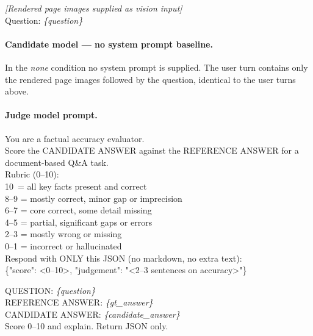 \documentclass{article} %
\begin{document}
\begin{promptbox}
\ttfamily\small
\textit{[Rendered page images supplied as vision input]}\\[3pt]
Question: \textit{\{question\}}
\end{promptbox}

\paragraph{Candidate model — no system prompt baseline.}
In the \textit{none} condition no system prompt is supplied.
The user turn contains only the rendered page images followed by the question,
identical to the user turns above.

\paragraph{Judge model prompt.}

\begin{promptbox}
\ttfamily\small
You are a factual accuracy evaluator.\\
Score the CANDIDATE ANSWER against the REFERENCE ANSWER for a document-based Q\&A task.\\[5pt]
Rubric (0--10):\\
\phantom{xx}10\ = all key facts present and correct\\
\phantom{xx}8--9 = mostly correct, minor gap or imprecision\\
\phantom{xx}6--7 = core correct, some detail missing\\
\phantom{xx}4--5 = partial, significant gaps or errors\\
\phantom{xx}2--3 = mostly wrong or missing\\
\phantom{xx}0--1 = incorrect or hallucinated\\[5pt]
Respond with ONLY this JSON (no markdown, no extra text):\\
\{"score": <0--10>, "judgement": "<2--3 sentences on accuracy>"\}
\end{promptbox}

\begin{promptbox}
\ttfamily\small
QUESTION: \textit{\{question\}}\\[4pt]
REFERENCE ANSWER: \textit{\{gt\_answer\}}\\[4pt]
CANDIDATE ANSWER: \textit{\{candidate\_answer\}}\\[4pt]
Score 0--10 and explain. Return JSON only.
\end{promptbox}
\end{document}
